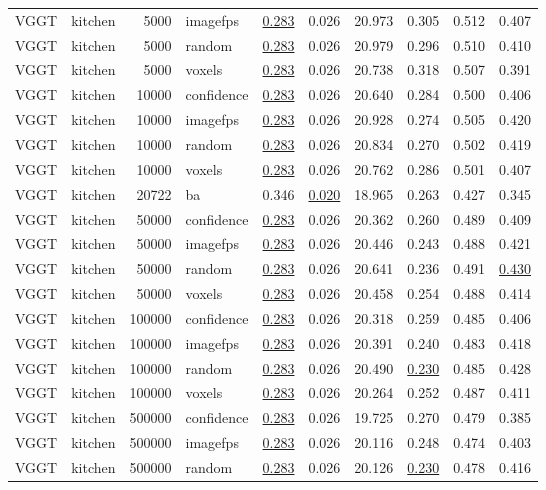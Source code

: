 \begin{table}[H]
\begin{tabular}{llrlrrrrrr}
VGGT & kitchen & 5000 & imagefps & \underline{0.283} & 0.026 & 20.973 & 0.305 & 0.512 & 0.407 \\
VGGT & kitchen & 5000 & random & \underline{0.283} & 0.026 & 20.979 & 0.296 & 0.510 & 0.410 \\
VGGT & kitchen & 5000 & voxels & \underline{0.283} & 0.026 & 20.738 & 0.318 & 0.507 & 0.391 \\
VGGT & kitchen & 10000 & confidence & \underline{0.283} & 0.026 & 20.640 & 0.284 & 0.500 & 0.406 \\
VGGT & kitchen & 10000 & imagefps & \underline{0.283} & 0.026 & 20.928 & 0.274 & 0.505 & 0.420 \\
VGGT & kitchen & 10000 & random & \underline{0.283} & 0.026 & 20.834 & 0.270 & 0.502 & 0.419 \\
VGGT & kitchen & 10000 & voxels & \underline{0.283} & 0.026 & 20.762 & 0.286 & 0.501 & 0.407 \\
VGGT & kitchen & 20722 & ba & 0.346 & \underline{0.020} & 18.965 & 0.263 & 0.427 & 0.345 \\
VGGT & kitchen & 50000 & confidence & \underline{0.283} & 0.026 & 20.362 & 0.260 & 0.489 & 0.409 \\
VGGT & kitchen & 50000 & imagefps & \underline{0.283} & 0.026 & 20.446 & 0.243 & 0.488 & 0.421 \\
VGGT & kitchen & 50000 & random & \underline{0.283} & 0.026 & 20.641 & 0.236 & 0.491 & \underline{0.430} \\
VGGT & kitchen & 50000 & voxels & \underline{0.283} & 0.026 & 20.458 & 0.254 & 0.488 & 0.414 \\
VGGT & kitchen & 100000 & confidence & \underline{0.283} & 0.026 & 20.318 & 0.259 & 0.485 & 0.406 \\
VGGT & kitchen & 100000 & imagefps & \underline{0.283} & 0.026 & 20.391 & 0.240 & 0.483 & 0.418 \\
VGGT & kitchen & 100000 & random & \underline{0.283} & 0.026 & 20.490 & \underline{0.230} & 0.485 & 0.428 \\
VGGT & kitchen & 100000 & voxels & \underline{0.283} & 0.026 & 20.264 & 0.252 & 0.487 & 0.411 \\
VGGT & kitchen & 500000 & confidence & \underline{0.283} & 0.026 & 19.725 & 0.270 & 0.479 & 0.385 \\
VGGT & kitchen & 500000 & imagefps & \underline{0.283} & 0.026 & 20.116 & 0.248 & 0.474 & 0.403 \\
VGGT & kitchen & 500000 & random & \underline{0.283} & 0.026 & 20.126 & \underline{0.230} & 0.478 & 0.416 \\

\end{tabular}
\end{table}
